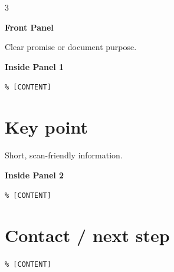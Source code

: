\documentclass[10pt,a4paper]{article}
\begin{document}
\begin{multicols}{3}
{\Huge\bfseries Front Panel\par}{\color{Accent} Clear promise or document purpose.\par}
\columnbreak
{\Large\bfseries Inside Panel 1\par}\texttt{\% [CONTENT]}
\section*{Key point}Short, scan-friendly information.
\columnbreak
{\Large\bfseries Inside Panel 2\par}\texttt{\% [CONTENT]}
\section*{Contact / next step}\texttt{\% [CONTENT]}
\end{multicols}
\end{document}
